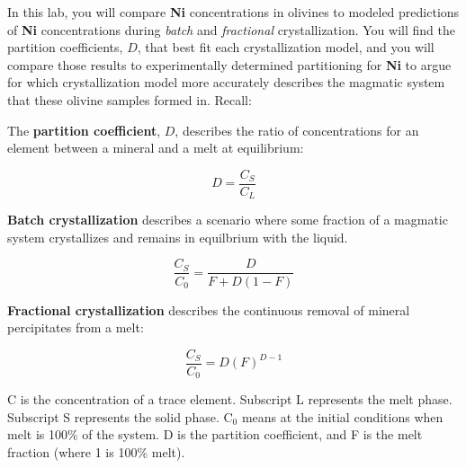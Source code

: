 In this lab, you will compare \textbf{Ni} concentrations in olivines to modeled predictions of \textbf{Ni} concentrations during \emph{batch} and \emph{fractional} crystallization. You will find the partition coefficients, $D$, that best fit each crystallization model, and you will compare those results to experimentally determined partitioning for \textbf{Ni} to argue for which crystallization model more accurately describes the magmatic system that these olivine samples formed in. Recall:

\medskip
\noindent The \textbf{partition coefficient}, $D$, describes the ratio of concentrations for an element between a mineral and a melt at equilibrium:

$$D=\frac{C_S}{C_L}$$

\noindent \textbf{Batch crystallization} describes a scenario where some fraction of a magmatic system crystallizes and remains in equilbrium with the liquid.

$$
	\frac{C_S}{C_0}=\frac{D}{F+D(1-F)}
$$

\noindent \textbf{Fractional crystallization} describes the continuous removal of mineral percipitates from a melt:

$$
	\frac{C_S}{C_{0}}=D(F)^{D-1}
$$

\noindent C is the concentration of a trace element. Subscript L represents the melt phase. Subscript S represents the solid phase. C$_0$ means at the initial conditions when melt is 100\% of the system. D is the partition coefficient, and F is the melt fraction (where 1 is 100\% melt).
